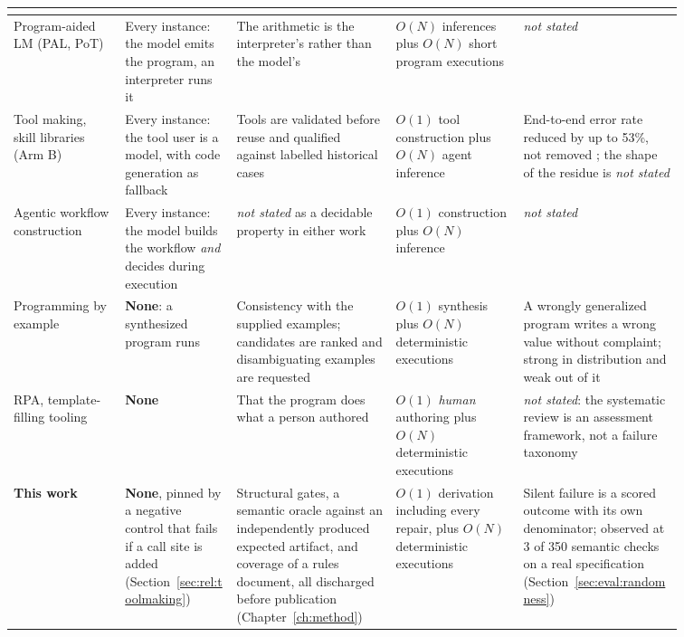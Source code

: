 \begin{table}[p]
\begin{tabular}{p{0.145\linewidth}p{0.145\linewidth}p{0.205\linewidth}p{0.165\linewidth}p{0.205\linewidth}}
  \cite{li2025judgerobustness} \\
\hline
Program-aided LM (PAL, PoT)
& Every instance: the model emits the program, an interpreter runs it
  \cite{gao2023pal,chen2023pot}
& The arithmetic is the interpreter's rather than the model's \cite{gao2023pal}
& $O(N)$ inferences plus $O(N)$ short program executions
& \emph{not stated} \\
\hline
Tool making, skill libraries (Arm B)
& Every instance: the tool user is a model, with code generation as fallback
  \cite{kujanpaa2026toolmaking}
& Tools are validated before reuse \cite{wang2024trove,yuan2024craft} and qualified against
  labelled historical cases \cite{kujanpaa2026toolmaking}
& $O(1)$ tool construction plus $O(N)$ agent inference \cite{cai2024latm}
& End-to-end error rate reduced by up to 53\%, not removed
  \cite{kujanpaa2026toolmaking}; the shape of the residue is \emph{not stated} \\
\hline
Agentic workflow construction
& Every instance: the model builds the workflow \emph{and} decides during execution
  \cite{ye2023proagent}
& \emph{not stated} as a decidable property in either work
& $O(1)$ construction plus $O(N)$ inference
& \emph{not stated} \\
\hline
Programming by example
& \textbf{None}: a synthesized program runs \cite{gulwani2011flashfill}
& Consistency with the supplied examples; candidates are ranked and disambiguating examples
  are requested \cite{gulwani2011flashfill}
& $O(1)$ synthesis plus $O(N)$ deterministic executions
& A wrongly generalized program writes a wrong value without complaint; strong in
  distribution and weak out of it \cite{li2024pbesolved} \\
\hline
RPA, template-filling tooling
& \textbf{None}
& That the program does what a person authored \cite{wewerka2020rpa}
& $O(1)$ \emph{human} authoring plus $O(N)$ deterministic executions
& \emph{not stated}: the systematic review is an assessment framework, not a failure taxonomy
  \cite{wewerka2020rpa} \\
\hline
\textbf{This work}
& \textbf{None}, pinned by a negative control that fails if a call site is added
  (Section~\ref{sec:rel:toolmaking})
& Structural gates, a semantic oracle against an independently produced expected artifact,
  and coverage of a rules document, all discharged before publication
  (Chapter~\ref{ch:method})
& $O(1)$ derivation including every repair, plus $O(N)$ deterministic executions
& Silent failure is a scored outcome with its own denominator; observed at 3 of 350 semantic
  checks on a real specification (Section~\ref{sec:eval:randomness}) \\
\hline
\end{tabular}
\end{table}

